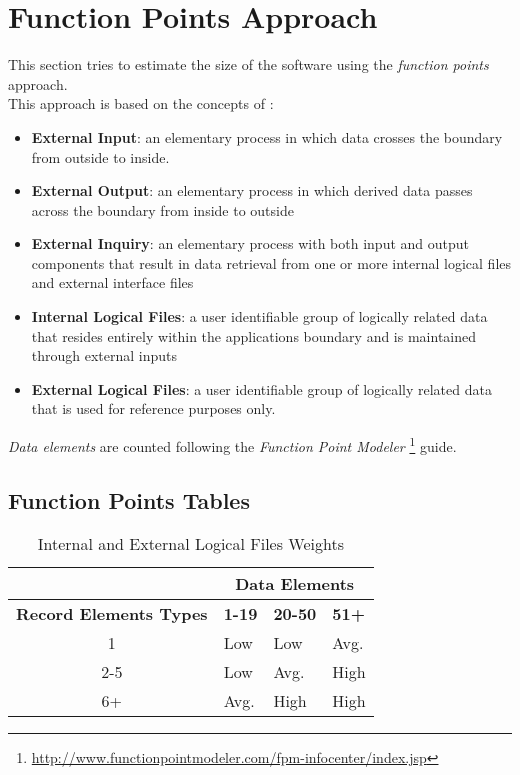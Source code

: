 \section{Function Points Approach} %
\label{sec:function_points_approach}
This section tries to estimate the size of the software using the \emph{function points} approach.\\
This approach is based on the concepts of :
\begin{itemize}
\item \textbf{External Input}: an elementary process in which data crosses the boundary from outside to inside.
\item \textbf{External Output}: an elementary process in which derived data passes across the boundary from inside to outside
\item \textbf{External Inquiry}: an elementary process with both input and output components that result in data retrieval from one or more internal logical files and external interface files
\item \textbf{Internal Logical Files}: a user identifiable group of logically related data that resides entirely within the applications boundary and is maintained through external inputs
\item \textbf{External Logical Files}: a user identifiable group of logically related data that is used for reference purposes only.
\end{itemize}
\emph{Data elements} are counted following the \emph{Function Point Modeler} \footnote{\url{http://www.functionpointmodeler.com/fpm-infocenter/index.jsp}} guide.

\subsection{Function Points Tables} %
\label{sub:function_points_tables}

\begin{table}[h]
\caption{Internal and External Logical Files Weights}
\begin{tabularx}{\textwidth}{|c|X|X|X|}
\hline
& \multicolumn{3}{|c|}{\textbf{Data Elements}}
\\ \hline
\textbf{\textbf{Record Elements Types}}      & \textbf{1-19} & \textbf{20-50}   & \textbf{51+}
\\ \hline
1 									   & Low           & Low              & Avg.
\\ \hline
2-5									   & Low           & Avg.             & High
\\ \hline
6+									   & Avg.          & High             & High
\\ \hline


\end{tabularx}
\end{table}


